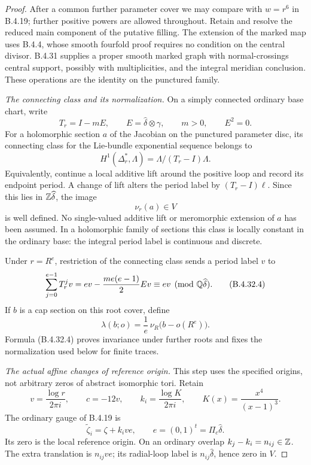 \begin{proof}
After a common further parameter cover we may compare with
$w=r^6$ in B.4.19; further positive powers are allowed throughout.
Retain and resolve the reduced main component of the putative
filling. The extension of the marked map uses B.4.4, whose
smooth fourfold proof requires no condition on the central
divisor. B.4.31 supplies a proper smooth marked graph with
normal-crossings central support, possibly with multiplicities,
and the integral meridian conclusion. These operations are
the identity on the punctured family.

\emph{The connecting class and its normalization.}
On a simply connected ordinary base chart, write
\[
 T_r=I-mE,\qquad
 E=\widehat\delta\otimes\gamma,\qquad m>0,\qquad E^2=0.
 \tag{B.4.32.2}
\]
For a holomorphic section $a$ of the Jacobian on the punctured
parameter disc, its connecting class for the Lie-bundle
exponential sequence belongs to
\[
 H^1(\Delta_r^*,\Lambda)
       =\Lambda/(T_r-I)\Lambda .
\]
Equivalently, continue a local additive lift around the positive
loop and record its endpoint period. A change of lift alters
the period label by $(T_r-I)\ell$. Since this lies in
$\mathbb Z\widehat\delta$, the image
\[
 \nu_r(a)\in V
 \tag{B.4.32.3}
\]
is well defined. No single-valued additive lift or meromorphic
extension of $a$ has been assumed. In a holomorphic family of
sections this class is locally constant in the ordinary base:
the integral period label is continuous and discrete.

Under $r=R^e$, restriction of the connecting class sends a
period label $v$ to
\[
 \sum_{j=0}^{e-1}T_r^jv
   =ev-\frac{me(e-1)}2Ev
   \equiv ev\pmod{\mathbb Q\widehat\delta}.
 \tag{B.4.32.4}
\]
If $b$ is a cap section on this root cover, define
\[
 \lambda(b;o)=\frac1e\,\nu_R\bigl(b-o(R^e)\bigr).
 \tag{B.4.32.5}
\]
Formula (B.4.32.4) proves invariance under further roots and
fixes the normalization used below for finite traces.

\emph{The actual affine changes of reference origin.}
This step uses the specified origins, not arbitrary zeros of
abstract isomorphic tori. Retain
\[
 v=\frac{\log r}{2\pi i},\qquad c=-12v,\qquad
 k_i=\frac{\log K}{2\pi i},\qquad
 K(x)=\frac{x^4}{(x-1)^3}.
\]
The ordinary gauge of B.4.19 is
\[
 \widetilde\zeta_i=\zeta+k_i v e,\qquad
 e=(0,1)^t=\Pi_c\widehat\delta .
 \tag{B.4.32.6}
\]
Its zero is the local reference origin. On an ordinary overlap
$k_j-k_i=n_{ij}\in\mathbb Z$. The extra translation is $n_{ij}ve$;
its radial-loop label is $n_{ij}\widehat\delta$, hence zero
in $V$.


\end{proof}
